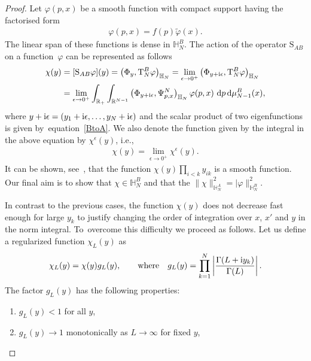 \begin{proof}
Let $\varphi(p,x)$ be a smooth function with compact support having the factorised form %
\begin{align}\label{f-factor-form}
\varphi(p,x)=f(p) \tilde \varphi(x). %
\end{align}
The linear span of these functions is dense in $\mathbb H_N^B$. The action of the operator $\mathrm S_{AB}$ on a func\-tion~$\varphi$ can be
represented as follows
\begin{align}\label{def;SAB}
\chi(y)& =[\mathrm S_{AB}\varphi](y) = \big( \Phi_y, \mathrm T_N^B \varphi \big)_{\mathbb H_N}
=\lim_{\epsilon\to 0^+} \big( \Phi_{y+{\rm i}\epsilon}, \mathrm T_N^B \varphi \big)_{\mathbb H_N} \notag
\\
&=\lim_{\epsilon\to 0^+} \int_{\mathbb R_+} \int_{\mathbb R^{N-1}} \big( \Phi_{y+{\rm i}\epsilon},\Psi^N_{p,{x}} \big)_{\mathbb H_N} \,\varphi(p, x)\,
 \, {\rm d}p\, {\rm d}\mu_{N-1}^B(x),
\end{align}
where $y+{\rm i}\epsilon=(y_1+{\rm i}\epsilon,\dots,y_N+{\rm i}\epsilon)$ and the scalar product of two eigenfunctions is given by~equa\-tion~\eqref{BtoA}. We also
denote the function given by the integral in the above equation by $\chi^\epsilon(y)$, i.e.,
\begin{gather*}
\chi(y)=\lim_{\epsilon\to 0^+}\chi^\epsilon(y).
\end{gather*}
It can be shown, see~\cite[Lemma~3.1]{Kozlowski:2014jka}, that the function $\chi( y)\prod_{i<k} y_{ik} $ is a smooth function. Our final aim is to show that $\chi\in \mathbb H_N^B$ and that the $\|\chi\|^2_{\mathbb H_N^A}=|\varphi\|^2_{\mathbb H_N^B}$.

In contrast to the previous cases, the function $\chi(y)$ does not decrease fast enough for large $ y_k $ to justify changing the order of
integration over $x$, $x'$ and $ y $ in the norm integral. To~overcome this difficulty we proceed as follows. Let us define a regularized
function $\chi_L( y)$ as
\begin{gather*}
\chi_L( y)=\chi(y) g_L( y), \qquad \text{where} \quad
g_L( y)=\prod_{k=1}^N\left|\frac{\Gamma(L+{\rm i}y_k)}{\Gamma(L)}\right|.
\end{gather*}
The factor $g_L(y)$ has the following properties:
\begin{enumerate}[label=($\roman*$)]

\item $g_L( y)<1$ for all $ y$,%

\item $g_L(y)\to 1$ monotonically as $L\to\infty$ for fixed $y$,%


\end{enumerate}
\end{proof}
